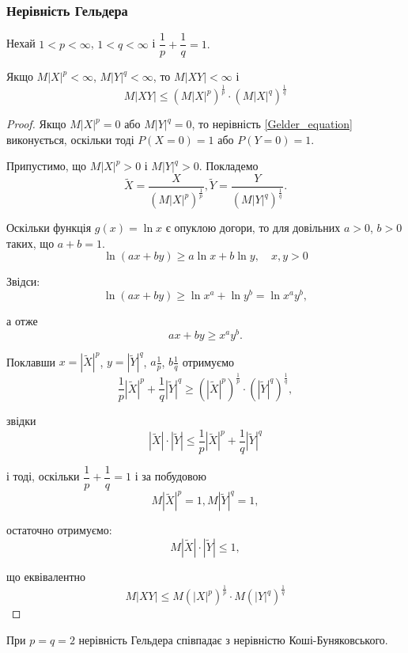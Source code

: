 \subsubsection{Нерівність Гельдера}
\begin{theorem}
    Нехай $1 < p < \infty$, $1 < q < \infty$ і
    $\dfrac{1}{p} + \dfrac{1}{q} = 1.$
    
    Якщо $M|X|^p < \infty$, $M|Y|^q < \infty$, то
    $M|XY| < \infty$ і
    \begin{equation}
    \label{Gelder_equation}
        M|XY| \leqslant (M|X|^p)^{\frac{1}{p}} \cdot (M|X|^q)^{\frac{1}{q}}
    \end{equation}
\end{theorem}
\begin{proof}
    Якщо $M|X|^p = 0$ або $M|Y|^q = 0$, то нерівність 
    \ref{Gelder_equation} виконується, оскільки тоді
    $P(X=0)=1$ або $P(Y=0)=1$.

    Припустимо, що $M|X|^p > 0$ і $M|Y|^q > 0$.
    Покладемо
    $$\widetilde{X} = \dfrac{X}{(M|X|^p)^{\frac{1}{p}}},
    \widetilde{Y} = \dfrac{Y}{(M|Y|^q)^{\frac{1}{q}}}.$$

    Оскільки функція $g(x) = \ln x$ є опуклою догори, то
    для довільних $a > 0$, $b > 0$ таких, що $a + b = 1$.
    $$\ln(ax + by) \geqslant a \ln x + b \ln y, \quad x, y > 0$$

    Звідси:
    $$\ln(ax+by) \geqslant \ln x^a + \ln y^b = \ln x^a y^b,$$

    а отже 
    $$ax + by \geqslant x^ay^b.$$

    Поклавши $x = |\widetilde{X}|^p$, $y = |\widetilde{Y}|^q$,
    $a \frac{1}{p}$, $b \frac{1}{q}$ 
    отримуємо
    $$\dfrac{1}{p}|\widetilde{X}|^p + \dfrac{1}{q}|\widetilde{Y}|^q
    \geqslant (|\widetilde{X}|^p)^{\frac{1}{p}} \cdot (|\widetilde{Y}|^q)^{\frac{1}{q}},$$

    звідки
    $$|\widetilde{X}|\cdot|\widetilde{Y}| \leqslant \dfrac{1}{p} |\widetilde{X}|^p + \dfrac{1}{q} |\widetilde{Y}|^q$$

    і тоді, оскільки $\dfrac{1}{p} + \dfrac{1}{q} = 1$ і за побудовою
    $$M|\widetilde{X}|^p = 1, M|\widetilde{Y}|^q = 1,$$

    остаточно отримуємо:
    $$M|\widetilde{X}| \cdot |\widetilde{Y}| \leqslant 1,$$

    що еквівалентно
    $$M|XY| \leqslant M(|X|^p)^{\frac{1}{p}} \cdot M(|Y|^q)^{\frac{1}{q}}$$
\end{proof}

\begin{remark}
    При $p = q = 2$ нерівність  Гельдера співпадає з нерівністю
    Коші-Буняковського.
\end{remark}


